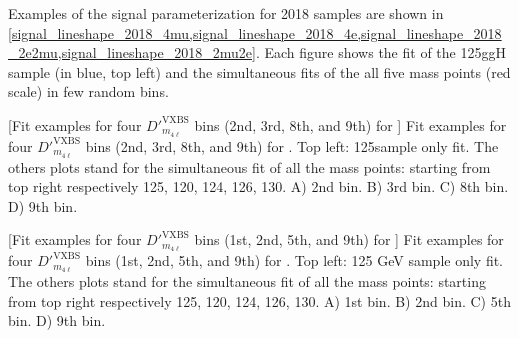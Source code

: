 Examples of the signal parameterization for 2018 samples are shown in \cref{signal_lineshape_2018_4mu,signal_lineshape_2018_4e,signal_lineshape_2018_2e2mu,signal_lineshape_2018_2mu2e}. 
Each figure shows the fit of the 125\GeV ggH sample (in blue, top left) and the simultaneous fits of the all five mass points (red scale) in few random bins.
\begin{multiFigure}
    \centering
        [Fit examples for four $D'^{\text{VXBS}}_{m_{4\ell}}$ bins (2nd, 3rd, 8th, and 9th) for ]
        {Fit examples for four $D'^{\text{VXBS}}_{m_{4\ell}}$ bins (2nd, 3rd, 8th, and 9th) for .
        Top left: 125\GeV sample only fit. The others plots stand for the simultaneous fit of all the mass points:
        starting from top right respectively 125, 120, 124, 126, 130\GeV.
        \;A) 2nd bin.
        \;B) 3rd bin.
        \;C) 8th bin.
        \;D) 9th bin.}
\label{signal_lineshape_2018_4mu}
\end{multiFigure}
\begin{multiFigure}
    \centering
        [Fit examples for four $D'^{\text{VXBS}}_{m_{4\ell}}$ bins (1st, 2nd, 5th, and 9th) for ]
        {Fit examples for four $D'^{\text{VXBS}}_{m_{4\ell}}$ bins (1st, 2nd, 5th, and 9th) 
        for . Top left: 125 GeV sample only fit. The others plots stand for the simultaneous 
        fit of all the mass points: starting from top right respectively 125, 120, 124, 126, 130\GeV.
        \;A) 1st bin.
        \;B) 2nd bin.
        \;C) 5th bin.
        \;D) 9th bin.}
    \label{signal_lineshape_2018_4e}
\end{multiFigure}
